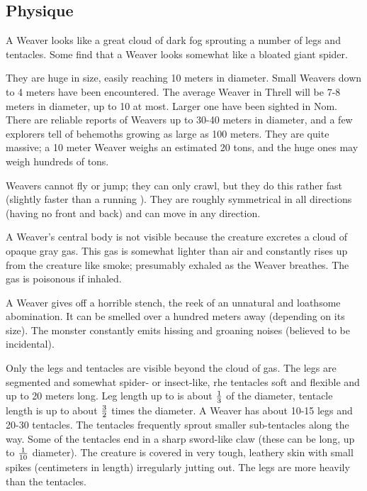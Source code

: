 








\subsection{Physique}
A Weaver looks like a great cloud of dark fog sprouting a number of legs and tentacles. Some find that a Weaver looks somewhat like a bloated giant spider. 

They are huge in size, easily reaching 10 meters in diameter. Small Weavers down to 4 meters have been encountered. The average Weaver in Threll will be 7-8 meters in diameter, up to 10 at most. Larger one have been sighted in Nom. There are reliable reports of Weavers up to 30-40 meters in diameter, and a few explorers tell of behemoths growing as large as 100 meters. They are quite massive; a 10 meter Weaver weighs an estimated 20 tons, and the huge ones may weigh hundreds of tons. 

Weavers cannot fly or jump; they can only crawl, but they do this rather fast (slightly faster than a running \human{}). They are roughly symmetrical in all directions (having no front and back) and can move in any direction. 

A Weaver's central body is not visible because the creature excretes a cloud of opaque gray gas. This gas is somewhat lighter than air and constantly rises up from the creature like smoke; presumably exhaled as the Weaver breathes. The gas is poisonous if inhaled. 

A Weaver gives off a horrible stench, the reek of an unnatural and loathsome abomination. It can be smelled over a hundred meters away (depending on its size). The monster constantly emits hissing and groaning noises (believed to be incidental). 

Only the legs and tentacles are visible beyond the cloud of gas. The legs are segmented and somewhat spider- or insect-like, rhe tentacles soft and flexible and up to 20 meters long. Leg length up to is about $\textstyle{\frac{1}{3}}$ of the diameter, tentacle length is up to about $\textstyle{\frac{3}{2}}$ times the diameter. A Weaver has about 10-15 legs and 20-30 tentacles. The tentacles frequently sprout smaller sub-tentacles along the way. Some of the tentacles end in a sharp sword-like claw (these can be long, up to $\textstyle{\frac{1}{10}}$ diameter). The creature is covered in very tough, leathery skin with small spikes (centimeters in length) irregularly jutting out. The legs are more heavily \armoured than the tentacles. 

